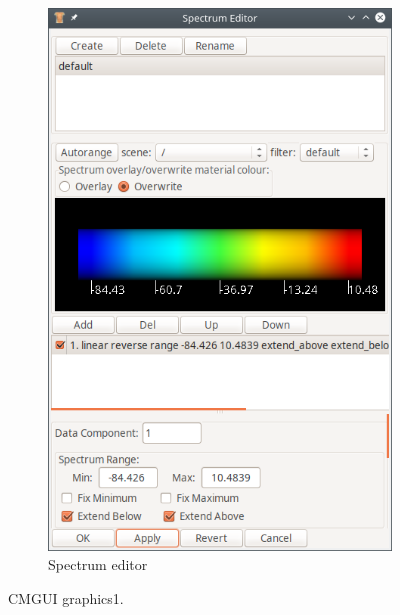 \begin{figure}
\begin{subfigure}[t]{0.363\textwidth}
    \includegraphics[width=\textwidth]{images/implementation/cmgui_spectrum.png}
    \caption{Spectrum editor}%
    \label{fig:cmgui_spectrum}%
  \end{subfigure}
  \caption{CMGUI graphics1.}%
  \label{fig:cmgui_output1}%
\end{figure}%

